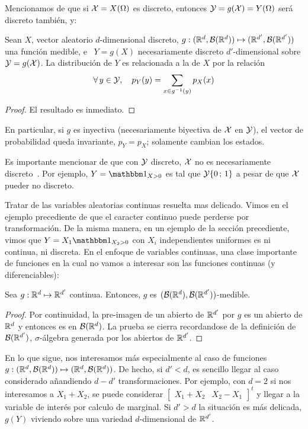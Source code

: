 Mencionamos  de que si  $\mathcal{X} =  X(\Omega)$ es  discreto, entonces  $\mathcal{Y} =  g(\mathcal{X}) =
Y(\Omega)$ ser\'a discreto tambi\'en, y:
%
\begin{teorema}
  Sean   $X$,   vector  aleatorio   $d$-dimensional   discreto,  $g:(\mathbb{R}^d   ,
  \mathcal{B}(\mathbb{R}^d)) \mapsto (\mathbb{R}^{d'} , \mathcal{B}(\mathbb{R}^{d'}))$ una funci\'on medible, e \
  $Y =  g(X)$ necesariamente discreto  $d'$-dimensional sobre $\mathcal{Y} =  g(\mathcal{X})$.  La
  distribuci\'on de $Y$ es relacionada a la de $X$ por la relaci\'on
  \[
  \forall \, y \in \mathcal{Y}, \quad p_Y(y) = \sum_{x \in g^{-1}(y)} p_X(x)
  \]
\end{teorema}
%
\begin{proof}
El resultado es inmediato.
\end{proof}
%
\noindent En particular,  si $g$ es inyectiva (necesariamente  biyectiva de $\mathcal{X}$
en $\mathcal{Y}$),  el vector  de probabilidad queda  invariante, $p_Y =  p_X$; solamente
cambian los estados.

Es  importante mencionar de  que con  $\mathcal{Y}$ discreto,  $\mathcal{X}$ no  es necesariamente
discreto~\cite{AthLah06}. Por ejemplo, $Y = \un_{X>0}$  es tal que $\mathcal{Y} \{ 0 \, ;
\, 1 \}$ a pesar de que $\mathcal{X}$ pueder no discreto.

Tratar de las variables aleatorias  continuas resuelta mas delicado. Vimos en el
ejemplo   precediente  de   que  el   caracter  continuo   puede   perderse  por
transformaci\'on. De la misma manera, en un ejemplo de la secci\'on precediente,
vimos  que  $Y =  X_1  \un_{X_2>0}$ con  $X_i$  independientes  uniformes es  ni
continua,  ni  discreta.  En  el  enfoque  de  variables  continuas,  una  clase
importante  de funciones  en la  cual  no vamos  a interesar  son las  funciones
continuas (y diferenciables):
%
\begin{lema}
  Sea   $g:   \mathbb{R}^d   \mapsto   \mathbb{R}^{d'}$   continua.   Entonces,   $g$   es
  $(\mathcal{B}(\mathbb{R}^d),\mathcal{B}(\mathbb{R}^{d'}))$-medible.
\end{lema}
%
\begin{proof}
  Por continuidad,  la pre-imagen de  un abierto de  $\mathbb{R}^{d'}$ por $g$  es un
  abierto  de $\mathbb{R}^d$  y entonces  es en  $\mathcal{B}(\mathbb{R}^d)$. La  prueba  se cierra
  recordandose  de  la   definici\'on  de  $\mathcal{B}(\mathbb{R}^{d'})$,  $\sigma$-\'algebra
  generada por los abiertos de $\mathbb{R}^{d'}$.
\end{proof}

En lo  que sigue, nos interesamos  m\'as especialmente al caso  de funciones $g:
(\mathbb{R}^d ,  \mathcal{B}(\mathbb{R}^d)) \mapsto (\mathbb{R}^d ,  \mathcal{B}(\mathbb{R}^d))$.  De hecho,  si $d' <
d$,   es    sencillo   llegar   al   caso    considerado   a\~nandiendo   $d-d'$
transformaciones. Por ejemplo, con $d = 2$  si nos interesamos a $X_1 + X_2$, se
puede considerar $\begin{bmatrix} X_1 + X_2 & X_2 - X_1\end{bmatrix}^t$ y llegar
a la variable de  inter\'es por calculo de marginal. Si $d'  > d$ la situaci\'on
es  m\'as  delicada,  $g(Y)$  viviendo  sobre una  variedad  $d$-dimensional  de
$\mathbb{R}^{d'}$.

